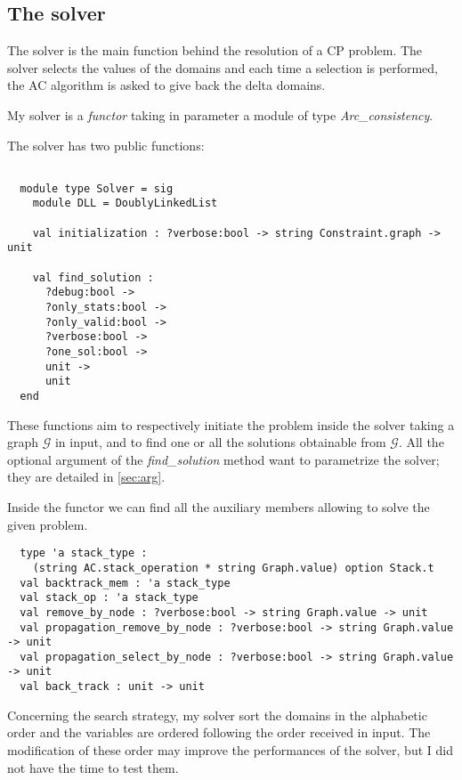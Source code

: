\documentclass{rapport}
\begin{document}
\subsection{The solver}

The solver is the main function behind the resolution of a CP problem. The solver selects the values of the domains and each time a selection is performed, the AC algorithm is asked to give back the delta domains.

My solver is a \textit{functor} taking in parameter a module of type \textit{Arc\_consistency}.

The solver has two public functions:
\begin{verbatim}

  module type Solver = sig
    module DLL = DoublyLinkedList

    val initialization : ?verbose:bool -> string Constraint.graph -> unit

    val find_solution :
      ?debug:bool ->
      ?only_stats:bool ->
      ?only_valid:bool ->
      ?verbose:bool ->
      ?one_sol:bool ->
      unit ->
      unit
  end

\end{verbatim}

These functions aim to respectively initiate the problem inside the solver taking a graph $\mathcal{G}$ in input, and to find one or all the solutions obtainable from $\mathcal{G}$. All the optional argument of the \textit{find\_solution} method want to parametrize the solver; they are detailed in \cref{sec:arg}.

Inside the functor we can find all the auxiliary members allowing to solve the given problem.

\begin{verbatim}
  type 'a stack_type :
    (string AC.stack_operation * string Graph.value) option Stack.t
  val backtrack_mem : 'a stack_type 
  val stack_op : 'a stack_type
  val remove_by_node : ?verbose:bool -> string Graph.value -> unit
  val propagation_remove_by_node : ?verbose:bool -> string Graph.value -> unit
  val propagation_select_by_node : ?verbose:bool -> string Graph.value -> unit
  val back_track : unit -> unit
\end{verbatim}

Concerning the search strategy, my solver sort the domains in the alphabetic order and the variables are ordered following the order received in input. The modification of these order may improve the performances of the solver, but I did not have the time to test them.
\end{document}
